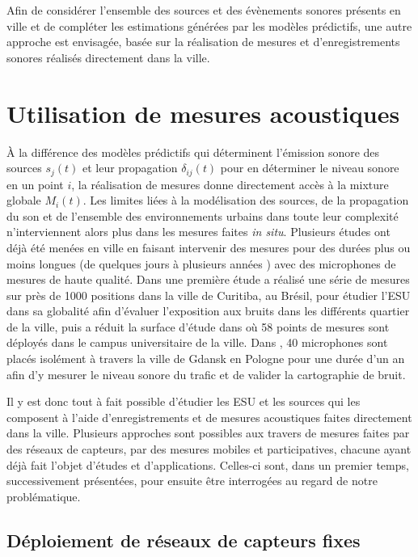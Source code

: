 Afin de considérer l'ensemble des sources et des évènements sonores présents en ville et de compléter les estimations générées par les modèles prédictifs, une autre approche est envisagée, basée sur la réalisation de mesures et d'enregistrements sonores réalisés directement dans la ville.

\section{Utilisation de mesures acoustiques}

À la différence des modèles prédictifs qui déterminent l'émission sonore des sources $s_j(t)$ et leur propagation $\delta_{ij}(t)$ pour en déterminer le niveau sonore en un point $i$, la réalisation de mesures donne directement accès à la mixture globale $M_{i}(t)$. Les limites liées à la modélisation des sources, de la propagation du son et de l'ensemble des environnements urbains dans toute leur complexité n'interviennent alors plus dans les mesures faites \textit{in situ}.
Plusieurs études ont déjà été menées en ville en faisant intervenir des mesures pour des durées plus ou moins longues (de quelques jours \cite{romeu2011street} à plusieurs années \cite{gaja2003sampling}) avec des microphones de mesures de haute qualité. Dans une première étude \cite{zannin2002environmental} a réalisé une série de mesures sur près de 1000 positions dans la ville de Curitiba, au Brésil, pour étudier l'ESU dans sa globalité afin d'évaluer l'exposition aux bruits dans les différents quartier de la ville, puis a réduit la surface d'étude dans \cite{zannin_characterization_2013} où 58 points de mesures sont déployés dans le campus universitaire de la ville.
Dans \cite{Mioduszewski}, 40 microphones sont placés isolément à travers la ville de Gdansk en Pologne pour une durée d'un an afin d'y mesurer le niveau sonore du trafic et de valider la cartographie de bruit.

Il y est donc tout à fait possible d'étudier les ESU et les sources qui les composent à l'aide d'enregistrements et de mesures acoustiques faites directement dans la ville. Plusieurs approches sont possibles aux travers de mesures faites par des réseaux de capteurs, par des mesures mobiles et participatives, chacune ayant déjà fait l'objet d'études et d'applications. Celles-ci sont, dans un premier temps, successivement présentées, pour ensuite être interrogées au regard de notre problématique.

\subsection{Déploiement de réseaux de capteurs fixes}

